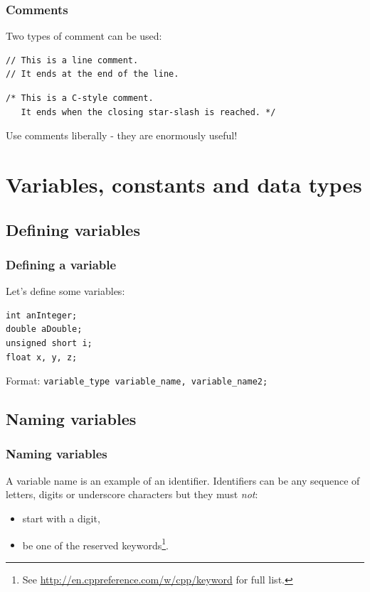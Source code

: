 \documentclass{beamer}
\begin{document}
\begin{frame}[fragile]
  \frametitle{Comments}
  Two types of comment can be used:
  \begin{lstlisting}
// This is a line comment.
// It ends at the end of the line.
  \end{lstlisting}
  \begin{lstlisting}
/* This is a C-style comment.
   It ends when the closing star-slash is reached. */
  \end{lstlisting}
    Use comments liberally - they are enormously useful!
\end{frame}

\section{Variables, constants and data types}

\subsection{Defining variables}

\begin{frame}[fragile]
\frametitle{Defining a variable}
  Let's define some variables:
  \begin{lstlisting}
int anInteger;
double aDouble;
unsigned short i;
float x, y, z;
  \end{lstlisting}
Format: \texttt{\textcolor{bluekeywords}{variable\_type} variable\_name, variable\_name2;}

\end{frame}

\subsection{Naming variables}

\begin{frame}
  \frametitle{Naming variables}
  
  A variable name is an example of an identifier.
  \pause
  Identifiers can be any sequence of letters, digits or underscore characters but they must \emph{not}:
	\begin{itemize}
  	\item start with a digit,
	  \item be one of the reserved keywords\footnote{See \url{http://en.cppreference.com/w/cpp/keyword} for full list.}.
	\end{itemize}
	\pause
\end{frame}
\end{document}
